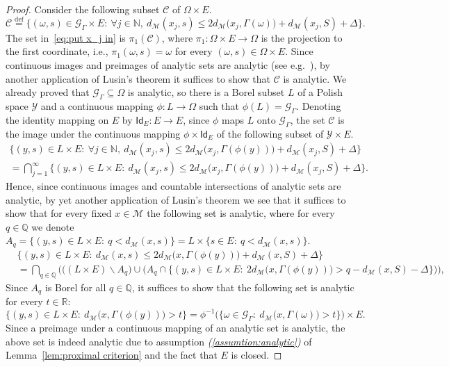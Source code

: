 \documentclass[11pt,reqno]{amsart}
\renewcommand{\le}{\leqslant}
\renewcommand{\setminus}{\smallsetminus}
\newcommand{\R}{\mathbb R}
\theoremstyle{remark}
\newcommand{\MM}{\mathcal{M}}
\renewcommand{\subset}{\subseteq}
\newcommand{\N}{\mathbb N}
\newcommand{\eqdef}{\stackrel{\mathrm{def}}{=}}
\renewcommand{\1}{\mathbf 1}
\newcommand{\ZZ}{\mathcal{Z}}
\newcommand{\cG}{\mathscr{G}}
\newcommand{\Q}{\mathbb{Q}}
\begin{document}
\begin{proof}
Consider the following subset $\mathcal{C}$ of  $ \Omega\times E$. %
$$
\mathcal{C}\eqdef  \big\{(\omega,s)\in  \cG_\Gamma\times E:\ \forall  j\in \N,\ d_\MM(x_j,s)\le 2d_\MM\big(x_j,\Gamma(\omega)\big)+d_\MM(x_j,S)+\Delta\big\}.
$$
The set in~\eqref{eq:put x_j in} is $\pi_1(\mathcal{C})$, where  $\pi_1:\Omega\times E\to \Omega$ is the projection to the first coordinate, i.e., $\pi_1(\omega,s)=\omega$ for every $(\omega,s)\in \Omega\times E$. Since continuous images and preimages of  analytic sets are analytic (see e.g.~\cite[Proposition~14.4]{Kec95}), by another application of Lusin's theorem it suffices to show that $\mathcal{C}$ is analytic. We already proved that $\cG_\Gamma\subset \Omega$ is analytic, so there is a Borel subset $L$ of  a Polish space $\mathcal{Y}$ and a continuous mapping $\phi:L\to \Omega$ such that $\phi(L)=\cG_\Gamma$. Denoting the identity mapping on $E$ by $\mathsf{Id}_E:E\to  E$, since $\phi$ maps $L$ onto $\cG_\Gamma$, the set $\mathcal{C}$ is the image under the continuous mapping $\phi\times \mathsf{Id}_E$ of the following subset of $\mathcal{Y}\times E$.
\begin{multline*}
 \big\{(y,s)\in  L\times E:\ \forall  j\in \N,\ d_\MM(x_j,s)\le 2d_\MM\big(x_j,\Gamma(\phi(y))\big)+d_\MM(x_j,S)+\Delta\big\}\\=
 \bigcap_{j=1}^\infty \big\{(y,s)\in  L\times E:\ d_\MM(x_j,s)\le 2d_\MM\big(x_j,\Gamma(\phi(y))\big)+d_\MM(x_j,S)+\Delta\big\}.
\end{multline*}
Hence, since continuous images and countable intersections of analytic sets are analytic,  by yet another application of Lusin's theorem we see that it suffices to show that for every fixed $x\in \MM$ the following set is analytic, where for every $q\in \Q$ we denote $A_q=\{(y,s)\in  L\times E:\ q< d_\MM(x,s)\}=L\times \{s\in   E:\ q< d_\MM(x,s)\}$.
\begin{align*}
&\big\{(y,s)\in  L\times E:\ d_\MM(x,s)\le 2d_\MM\big(x,\Gamma(\phi(y))\big)+d_\MM(x,S)+\Delta\big\}\\
&= \bigcap_{q\in \Q} \bigg(\big((L\times E)\setminus A_q\big)\cup \Big(A_q\cap \big\{(y,s)\in  L\times E:\ 2d_\MM\big(x,\Gamma(\phi(y))\big)>q-d_\MM(x,S)-\Delta\big\}\Big)\bigg),
\end{align*}
 Since $A_q$ is Borel for all $q\in \Q$, it  suffices to show that the following set is analytic for every $t\in \R$:
$$
 \big\{(y,s)\in  L\times E:\ d_\MM\big(x,\Gamma(\phi(y))\big)>t\big\}= \phi^{-1}\Big(\big\{\omega\in \cG_\Gamma:\ d_\MM\big(x,\Gamma(\omega)\big)>t\big\}\Big)\times E.
$$
Since a preimage under a  continuous  mapping of an analytic set is analytic, the above set is indeed analytic due to assumption {\em (\ref{assumtion:analytic})} of Lemma~\ref{lem:proximal criterion}  and the fact that $E$ is closed.
\end{proof}
\end{document}
